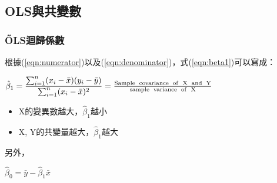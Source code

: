 \documentclass[xcolor=dvipsnames]{beamer}
\begin{document}
\subsection{OLS與共變數}
\begin{frame}\frametitle{\H OLS迴歸係數}
根據(\ref{eqn:numerator})以及(\ref{eqn:denominator})，式(\ref{eqn:beta1})可以寫成：\\
\smallskip
\begin{center}
$ \mathlarger{\hat{\beta}_{1}=\frac{\sum_{i=1}^n(x_{i}-\bar{x})(y_{i}-\bar{y})}{\sum_{i=1}^n(x_{i}-\bar{x})^2} }=\frac{\mathrm {Sample\hspace{.5em} covariance\hspace{.5em} of\hspace{.5em} X\hspace{.5em} and\hspace{.5em} Y}}{\mathrm {sample\hspace{.5em} variance\hspace{.5em} of\hspace{.5em} X}}$\\
\end{center}
\smallskip
\begin{itemize}
\item X的變異數越大，$\hat{\beta}_{1}$越小
\item X, Y的共變量越大，$\hat{\beta}_{1}$越大
\end{itemize}
另外，
\begin{center}
$ \hat{\beta}_{0}=\bar{y}-\hat{\beta}_{1}\bar{x} $
\end{center}
\end{frame}
\end{document}
